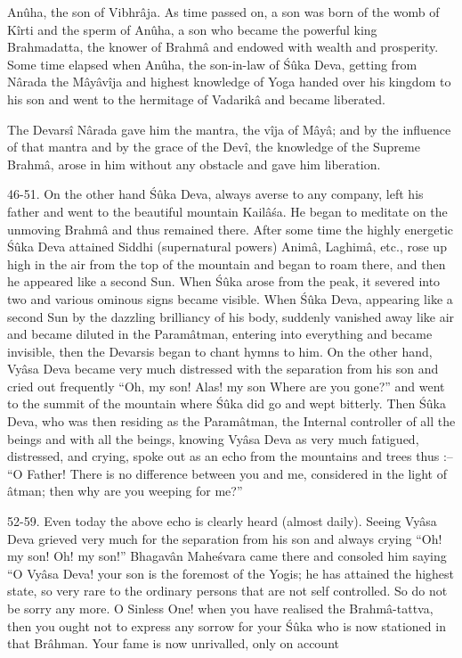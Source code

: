 An\^uha, the son of Vibhr\^aja. As time passed on, a son was born of the womb of K\^irti and the sperm of An\^uha, a son who became the powerful king Brahmadatta, the knower of Brahm\^a and endowed with wealth and prosperity. Some time elapsed when An\^uha, the son-in-law of \'S\^uka Deva, getting from N\^arada the M\^ay\^av\^ija and highest knowledge of Yoga handed over his kingdom to his son and went to the hermitage of Vadarik\^a and became liberated.

The Devars\^i N\^arada gave him the mantra, the v\^ija of M\^ay\^a; and by the influence of that mantra and by the grace of the Dev\^i, the knowledge of the Supreme Brahm\^a, arose in him without any obstacle and gave him liberation.

46-51. On the other hand \'S\^uka Deva, always averse to any company, left his father and went to the beautiful mountain Kail\^a\'sa. He began to meditate on the unmoving Brahm\^a and thus remained there. After some time the highly energetic \'S\^uka Deva attained Siddhi (supernatural powers) Anim\^a, Laghim\^a, etc., rose up high in the air from the top of the mountain and began to roam there, and then he appeared like a second Sun. When \'S\^uka arose from the peak, it severed into two and various ominous signs became visible. When \'S\^uka Deva, appearing like a second Sun by the dazzling brilliancy of his body, suddenly vanished away like air and became diluted in the Param\^atman, entering into everything and became invisible, then the Devarsis began to chant hymns to him. On the other hand, Vy\^asa Deva became very much distressed with the separation from his son and cried out frequently ``Oh, my son! Alas! my son Where are you gone?'' and went to the summit of the mountain where \'S\^uka did go and wept bitterly. Then \'S\^uka Deva, who was then residing as the Param\^atman, the Internal controller of all the beings and with all the beings, knowing Vy\^asa Deva as very much fatigued, distressed, and crying, spoke out as an echo from the mountains and trees thus :-- ``O Father! There is no difference between you and me, considered in the light of \^atman; then why are you weeping for me?''

52-59. Even today the above echo is clearly heard (almost daily). Seeing Vy\^asa Deva grieved very much for the separation from his son and always crying ``Oh! my son! Oh! my son!'' Bhagav\^an Mahe\'svara came there and consoled him saying ``O Vy\^asa Deva! your son is the foremost of the Yogis; he has attained the highest state, so very rare to the ordinary persons that are not self controlled. So do not be sorry any more. O Sinless One! when you have realised the Brahm\^a-tattva, then you ought not to express any sorrow for your \'S\^uka who is now stationed in that Br\^ahman. Your fame is now unrivalled, only on account

